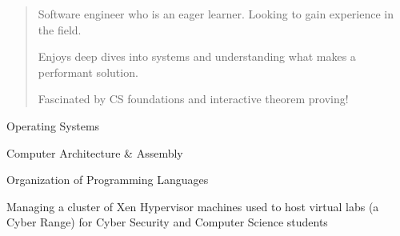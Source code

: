   \begin{quote}
    Software engineer who is an eager learner. Looking to gain experience in the field. \par
    Enjoys deep dives into systems and understanding what makes a performant solution. \par
    Fascinated by CS foundations and interactive theorem proving!
  \end{quote}


  \smallskip{}

  \smallskip{}
  \cvtag{\LaTeX}
  
  Operating Systems \par
  Computer Architecture \& Assembly \par
  Organization of Programming Languages
  

  Managing a cluster of Xen Hypervisor machines used to host virtual labs (a Cyber Range) for Cyber Security and Computer Science students

